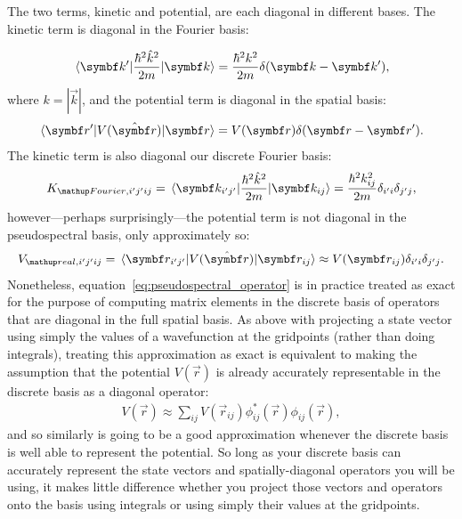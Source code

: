 The two terms, kinetic and potential, are each diagonal in different bases. The kinetic term is diagonal in the Fourier basis:

\begin{align}
\matrixel{\vec k^\prime}{\frac{\hbar^2 \hat k^2}{2m}}{\vec k} = \frac{\hbar^2 k^2}{2m}\delta(\vec k - \vec k^\prime),
\end{align}
where $k = |\vec k|$, and the potential term is diagonal in the spatial basis:
\begin{align}
\matrixel{\vec r^\prime}{V(\hat{\vec r})}{\vec r} = V(\vec r) \delta(\vec r - \vec r^\prime).
\end{align}
The kinetic term is also diagonal our discrete Fourier basis:
\begin{align}
K_{\up{Fourier}, i^\prime j^\prime i j} = \matrixel{\vec k_{i^\prime j^\prime}}{\frac{\hbar^2 \hat k^2}{2m}}{\vec k_{i j}} = \frac{\hbar^2 k_{i j}^2}{2m}\delta_{i^\prime i}\delta_{j^\prime j},
\end{align}
however---perhaps surprisingly---the potential term is not diagonal in the pseudospectral basis, only approximately so:
\begin{align}\label{eq:pseudospectral_operator}
V_{\up{real}, i^\prime j^\prime i j} = \matrixel{\vec r_{i^\prime j^\prime}}{V(\hat{\vec r})}{\vec r_{i j}} \approx V(\vec r_{i j}) \delta_{i^\prime i}\delta_{j^\prime j}.
\end{align}
Nonetheless, equation~\eqref{eq:pseudospectral_operator} is in practice treated as exact for the purpose of computing matrix elements in the discrete basis of operators that are diagonal in the full spatial basis. As above with projecting a state vector using simply the values of a wavefunction at the gridpoints (rather than doing integrals), treating this approximation as exact is equivalent to making the assumption that the potential $V(\vec r)$ is already accurately representable in the discrete basis as a diagonal operator:
\begin{align}
V(\vec r) \approx \sum_{ij} V(\vec r_{ij}) \phi^\ast_{ij}(\vec r)\phi_{ij}(\vec r),
\end{align}
and so similarly is going to be a good approximation whenever the discrete basis is well able to represent the potential. So long as your discrete basis can accurately represent the state vectors and spatially-diagonal operators you will be using, it makes little difference whether you project those vectors and operators onto the basis using integrals or using simply their values at the gridpoints.

